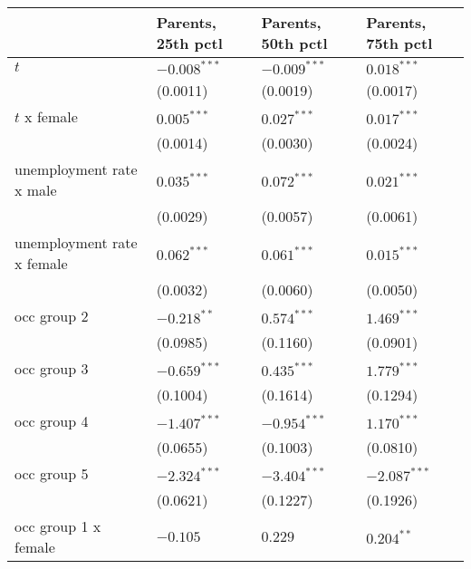 \begin{tabular}{llll}
\toprule
{} & Parents, 25th pctl & Parents, 50th pctl & Parents, 75th pctl \\
\midrule
$t$                                    &     $-0.008^{***}$ &     $-0.009^{***}$ &      $0.018^{***}$ \\
                                       &           (0.0011) &           (0.0019) &           (0.0017) \\
$t$ x female                           &      $0.005^{***}$ &      $0.027^{***}$ &      $0.017^{***}$ \\
                                       &           (0.0014) &           (0.0030) &           (0.0024) \\
unemployment rate x male               &      $0.035^{***}$ &      $0.072^{***}$ &      $0.021^{***}$ \\
                                       &           (0.0029) &           (0.0057) &           (0.0061) \\
unemployment rate x female             &      $0.062^{***}$ &      $0.061^{***}$ &      $0.015^{***}$ \\
                                       &           (0.0032) &           (0.0060) &           (0.0050) \\
occ group 2                            &      $-0.218^{**}$ &      $0.574^{***}$ &      $1.469^{***}$ \\
                                       &           (0.0985) &           (0.1160) &           (0.0901) \\
occ group 3                            &     $-0.659^{***}$ &      $0.435^{***}$ &      $1.779^{***}$ \\
                                       &           (0.1004) &           (0.1614) &           (0.1294) \\
occ group 4                            &     $-1.407^{***}$ &     $-0.954^{***}$ &      $1.170^{***}$ \\
                                       &           (0.0655) &           (0.1003) &           (0.0810) \\
occ group 5                            &     $-2.324^{***}$ &     $-3.404^{***}$ &     $-2.087^{***}$ \\
                                       &           (0.0621) &           (0.1227) &           (0.1926) \\
occ group 1 x female                   &           $-0.105$ &            $0.229$ &       $0.204^{**}$ \\

\end{tabular}
